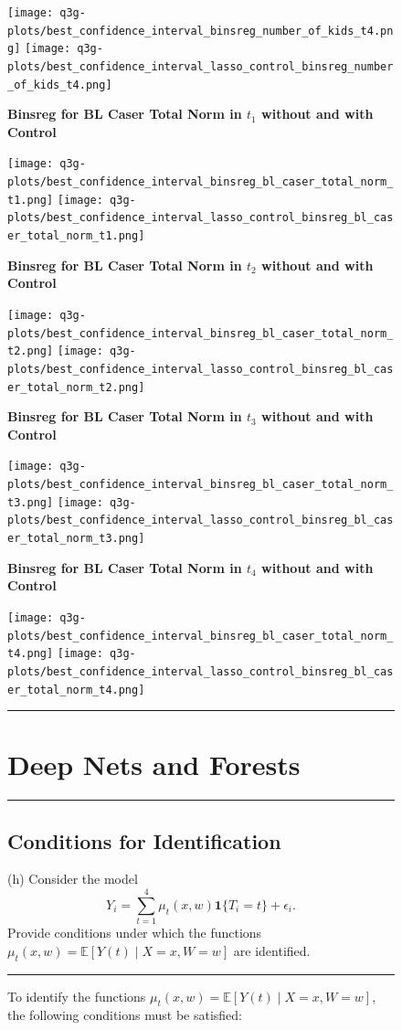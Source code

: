 \documentclass{article}
\newenvironment{colorparagraph}[1]{\par\color{#1}}{\par}
\begin{document}
{\begin{figure}[H]
  \texttt{[image: q3g-plots/best\_confidence\_interval\_binsreg\_number\_of\_kids\_t4.png]}
  \texttt{[image: q3g-plots/best\_confidence\_interval\_lasso\_control\_binsreg\_number\_of\_kids\_t4.png]}
\end{figure}
  \begin{figure}[H]
    \centering
  
  \textbf{Binsreg for BL Caser Total Norm in $t_1$ without and with Control}

    \texttt{[image: q3g-plots/best\_confidence\_interval\_binsreg\_bl\_caser\_total\_norm\_t1.png]}
  \texttt{[image: q3g-plots/best\_confidence\_interval\_lasso\_control\_binsreg\_bl\_caser\_total\_norm\_t1.png]}
  
  \textbf{Binsreg for BL Caser Total Norm in $t_2$ without and with Control}

  \texttt{[image: q3g-plots/best\_confidence\_interval\_binsreg\_bl\_caser\_total\_norm\_t2.png]}
  \texttt{[image: q3g-plots/best\_confidence\_interval\_lasso\_control\_binsreg\_bl\_caser\_total\_norm\_t2.png]}
  
  \textbf{Binsreg for BL Caser Total Norm in $t_3$ without and with Control}

  \texttt{[image: q3g-plots/best\_confidence\_interval\_binsreg\_bl\_caser\_total\_norm\_t3.png]}
  \texttt{[image: q3g-plots/best\_confidence\_interval\_lasso\_control\_binsreg\_bl\_caser\_total\_norm\_t3.png]}
  
  \textbf{Binsreg for BL Caser Total Norm in $t_4$ without and with Control}

  \texttt{[image: q3g-plots/best\_confidence\_interval\_binsreg\_bl\_caser\_total\_norm\_t4.png]}
  \texttt{[image: q3g-plots/best\_confidence\_interval\_lasso\_control\_binsreg\_bl\_caser\_total\_norm\_t4.png]}
\end{figure}
}

\begin{figure}[H]
\begin{colorparagraph}{questioncolor}
\rule{\textwidth}{0.5pt}

\section*{Deep Nets and Forests}
\rule{\textwidth}{0.5pt}
\label{q3h}
\subsection{Conditions for Identification}
(h) Consider the model
\[
Y_i = \sum_{t=1}^4 \mu_t(x, w) \mathbf{1}\{T_i = t\} + \epsilon_i.
\]
Provide conditions under which the functions \( \mu_t(x, w) = \mathbb{E}[Y(t) \mid X = x, W = w] \) are identified.

\rule{\textwidth}{0.5pt}
\end{colorparagraph}

To identify the functions \( \mu_t(x, w) = \mathbb{E}[Y(t) \mid X = x, W = w] \), the following conditions must be satisfied:
\end{figure}
\end{document}
